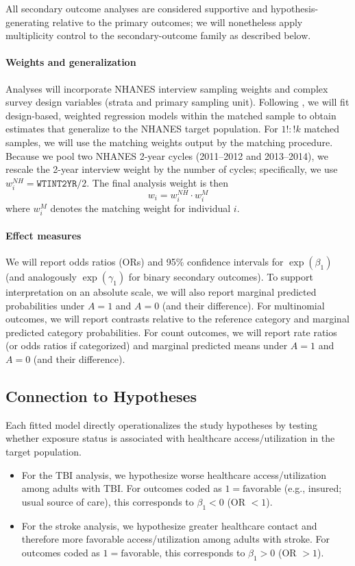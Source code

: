\documentclass{article}
\begin{document}
All secondary outcome analyses are considered supportive and hypothesis-generating relative to the primary outcomes; we will nonetheless apply multiplicity control to the secondary-outcome family as described below.

\paragraph{Weights and generalization}

Analyses will incorporate NHANES interview sampling weights and complex survey design variables (strata and primary sampling unit). Following \citet{dugoff2014}, we will fit design-based, weighted regression models within the matched sample to obtain estimates that generalize to the NHANES target population. For $1!:!k$ matched samples, we will use the matching weights output by the matching procedure. Because we pool two NHANES 2-year cycles (2011--2012 and 2013--2014), we rescale the 2-year interview weight by the number of cycles; specifically, we use $w_i^{NH}=\texttt{WTINT2YR}/2$. The final analysis weight is then
\[w_i = w_i^{NH}\cdot w_i^M\]
where $w_i^{M}$ denotes the matching weight for individual $i$.

\paragraph{Effect measures}

We will report odds ratios (ORs) and 95\% confidence intervals for $\exp(\beta_1)$ (and analogously $\exp(\gamma_1)$ for binary secondary outcomes). To support interpretation on an absolute scale, we will also report marginal predicted probabilities under $A=1$ and $A=0$ (and their difference). For multinomial outcomes, we will report contrasts relative to the reference category and marginal predicted category probabilities. For count outcomes, we will report rate ratios (or odds ratios if categorized) and marginal predicted means under $A=1$ and $A=0$ (and their difference).

\subsection{Connection to Hypotheses}

Each fitted model directly operationalizes the study hypotheses by testing whether exposure status is associated with healthcare access/utilization in the target population.

\begin{itemize}
    \item For the TBI analysis, we hypothesize worse healthcare access/utilization among adults with TBI. For outcomes coded as $1=\text{favorable}$ (e.g., insured; usual source of care), this corresponds to $\beta_1 < 0$ (OR $<1$).

    \item For the stroke analysis, we hypothesize greater healthcare contact and therefore more favorable access/utilization among adults with stroke. For outcomes coded as $1=\text{favorable}$, this corresponds to $\beta_1 > 0$ (OR $>1$).
\end{itemize}
\end{document}
